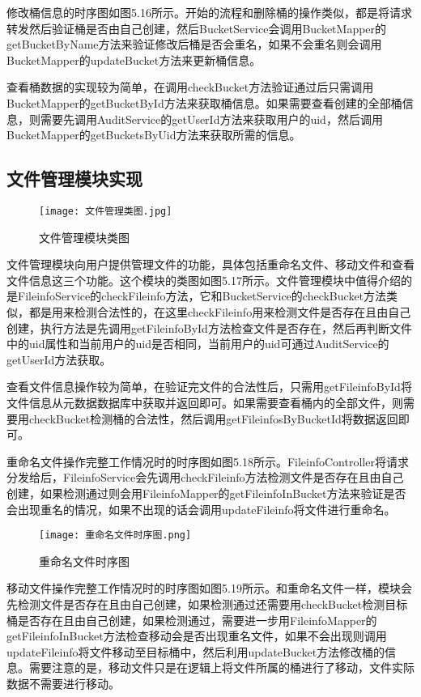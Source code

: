 修改桶信息的时序图如图5.16所示。开始的流程和删除桶的操作类似，都是将请求转发然后验证桶是否由自己创建，然后BucketService会调用BucketMapper的getBucketByName方法来验证修改后桶是否会重名，如果不会重名则会调用BucketMapper的updateBucket方法来更新桶信息。

查看桶数据的实现较为简单，在调用checkBucket方法验证通过后只需调用BucketMapper的getBucketById方法来获取桶信息。如果需要查看创建的全部桶信息，则需要先调用AuditService的getUserId方法来获取用户的uid，然后调用BucketMapper的getBucketsByUid方法来获取所需的信息。

\subsection{文件管理模块实现}

\begin{figure}
  \centering
  \texttt{[image: 文件管理类图.jpg]}
  \caption{文件管理模块类图}
\end{figure}

文件管理模块向用户提供管理文件的功能，具体包括重命名文件、移动文件和查看文件信息这三个功能。这个模块的类图如图5.17所示。文件管理模块中值得介绍的是FileinfoService的checkFileinfo方法，它和BucketService的checkBucket方法类似，都是用来检测合法性的，在这里checkFileinfo用来检测文件是否存在且由自己创建，执行方法是先调用getFileinfoById方法检查文件是否存在，然后再判断文件中的uid属性和当前用户的uid是否相同，当前用户的uid可通过AuditService的getUserId方法获取。

查看文件信息操作较为简单，在验证完文件的合法性后，只需用getFileinfoById将文件信息从元数据数据库中获取并返回即可。如果需要查看桶内的全部文件，则需要用checkBucket检测桶的合法性，然后调用getFileinfosByBucketId将数据返回即可。

重命名文件操作完整工作情况时的时序图如图5.18所示。FileinfoController将请求分发给后，FileinfoService会先调用checkFileinfo方法检测文件是否存在且由自己创建，如果检测通过则会用FileinfoMapper的getFileinfoInBucket方法来验证是否会出现重名的情况，如果不出现的话会调用updateFileinfo将文件进行重命名。

\begin{figure}
  \centering
  \texttt{[image: 重命名文件时序图.png]}
  \caption{重命名文件时序图}
\end{figure}

移动文件操作完整工作情况时的时序图如图5.19所示。和重命名文件一样，模块会先检测文件是否存在且由自己创建，如果检测通过还需要用checkBucket检测目标桶是否存在且由自己创建，如果检测通过，需要进一步用FileinfoMapper的getFileinfoInBucket方法检查移动会是否出现重名文件，如果不会出现则调用updateFileinfo将文件移动至目标桶中，然后利用updateBucket方法修改桶的信息。需要注意的是，移动文件只是在逻辑上将文件所属的桶进行了移动，文件实际数据不需要进行移动。

